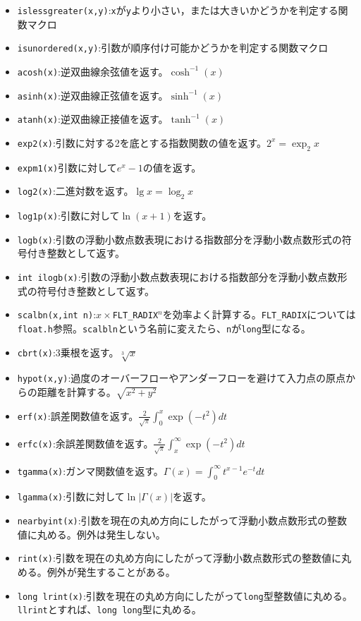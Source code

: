 \begin{itemize}
\item \verb|islessgreater(x,y)|:\verb|x|が\verb|y|より小さい，または大きいかどうかを判定する関数マクロ
\item \verb|isunordered(x,y)|:引数が順序付け可能かどうかを判定する関数マクロ
\item \verb|acosh(x)|:逆双曲線余弦値を返す。$\cosh^{-1}(x)$
\item \verb|asinh(x)|:逆双曲線正弦値を返す。$\sinh^{-1}(x)$
\item \verb|atanh(x)|:逆双曲線正接値を返す。$\tanh^{-1}(x)$
\item \verb|exp2(x)|:引数に対する2を底とする指数関数の値を返す。$2^x=\exp_2 x$
\item \verb|expm1(x)|引数に対して$e^x-1$の値を返す。
\item \verb|log2(x)|:二進対数を返す。$\lg x=\log_2 x$
\item \verb|log1p(x)|:引数に対して$\ln (x+1)$を返す。
\item \verb|logb(x)|:引数の浮動小数点数表現における指数部分を浮動小数点数形式の符号付き整数として返す。
\item \verb|int ilogb(x)|:引数の浮動小数点数表現における指数部分を浮動小数点数形式の符号付き整数として返す。
\item \verb|scalbn(x,int n)|:$x\times$\verb|FLT_RADIX|$^n$を効率よく計算する。\verb|FLT_RADIX|については\\ \verb|float.h|参照。\verb|scalbln|という名前に変えたら、\verb|n|が\verb|long|型になる。
\item \verb|cbrt(x)|:3乗根を返す。$\sqrt[3]{x}$
\item \verb|hypot(x,y)|:過度のオーバーフローやアンダーフローを避けて入力点の原点からの距離を計算する。$\sqrt{x^2+y^2}$
\item \verb|erf(x)|:誤差関数値を返す。$\frac{2}{\sqrt{\pi}}\int^{x}_{0} \exp (-t^2) dt$
\item \verb|erfc(x)|:余誤差関数値を返す。$\frac{2}{\sqrt{\pi}}\int^{\infty}_{x} \exp (-t^2) dt$
\item \verb|tgamma(x)|:ガンマ関数値を返す。$\Gamma(x)=\int^{\infty}_{0} t^{x-1}e^{-t}dt$
\item \verb|lgamma(x)|:引数に対して$\ln|\Gamma(x)|$を返す。
\item \verb|nearbyint(x)|:引数を現在の丸め方向にしたがって浮動小数点数形式の整数値に丸める。例外は発生しない。
\item \verb|rint(x)|:引数を現在の丸め方向にしたがって浮動小数点数形式の整数値に丸める。例外が発生することがある。
\item \verb|long lrint(x)|:引数を現在の丸め方向にしたがって\verb|long|型整数値に丸める。\verb|llrint|とすれば、\verb|long long|型に丸める。

\end{itemize}
